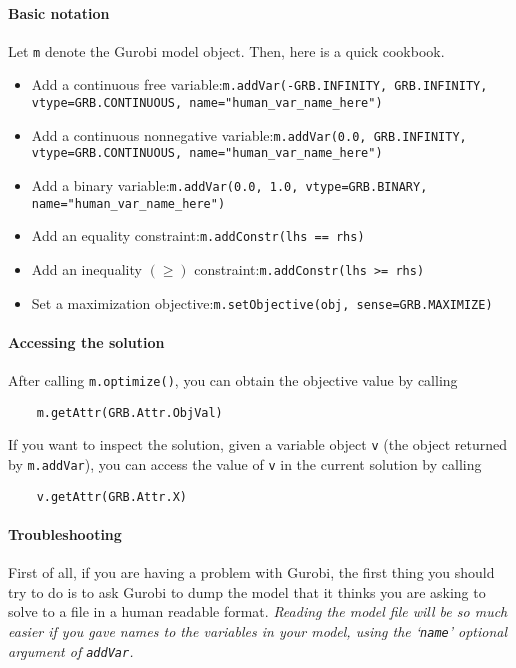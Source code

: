 \documentclass{homework}
\begin{document}
\paragraph{Basic notation}
Let \texttt{m} denote the Gurobi model object. Then, here is a quick cookbook.
\begin{itemize}
    \item Add a continuous free variable:\newline\verb|m.addVar(-GRB.INFINITY, GRB.INFINITY, vtype=GRB.CONTINUOUS, name="human_var_name_here")|
    \item Add a continuous nonnegative variable:\newline\verb|m.addVar(0.0, GRB.INFINITY, vtype=GRB.CONTINUOUS, name="human_var_name_here")|
    \item Add a binary variable:\newline\verb|m.addVar(0.0, 1.0, vtype=GRB.BINARY, name="human_var_name_here")|
    \item Add an equality constraint:\newline\verb|m.addConstr(lhs == rhs)|
    \item Add an inequality $(\ge)$ constraint:\newline\verb|m.addConstr(lhs >= rhs)|
    \item Set a maximization objective:\newline\verb|m.setObjective(obj, sense=GRB.MAXIMIZE)|
\end{itemize}

\paragraph{Accessing the solution} After calling \verb|m.optimize()|, you can obtain the objective value by calling
\begin{verbatim}
    m.getAttr(GRB.Attr.ObjVal)
\end{verbatim}

If you want to inspect the solution, given a variable object \texttt{v} (the object returned by \texttt{m.addVar}), you can access the value of \texttt{v} in the current solution by calling
\begin{verbatim}
    v.getAttr(GRB.Attr.X)
\end{verbatim}

\paragraph{Troubleshooting} First of all, if you are having a problem with Gurobi, the first thing you should try to do is to ask Gurobi to dump the model that it thinks you are asking to solve to a file in a human readable format. \emph{Reading the model file will be so much easier if you gave names to the variables in your model, using the `\texttt{name}' optional argument of \texttt{addVar}.}
\end{document}
